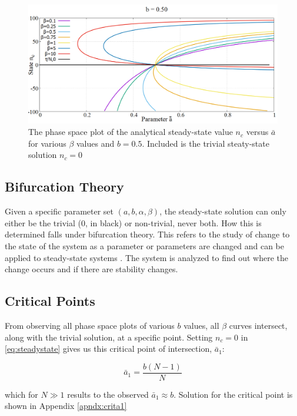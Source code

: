 \begin{figure}
 \centering
  \includegraphics[width=\linewidth]{images/chapter3/phaseSpace.png}
  \caption{The phase space plot of the analytical steady-state value $n_{c}$ versus $\bar{a}$ for various $\beta$ values and $b = 0.5$. Included is the trivial steaty-state solution $n_{c} = 0$}
  \label{fig:phaseSpace}
\end{figure}

\subsection{Bifurcation Theory}
\hspace{\parindent}Given a specific parameter set $(a,b,\alpha,\beta)$, the steady-state solution can only either be the trivial ($0$, in black) or non-trivial, never both. How this is determined falls under bifurcation theory. 
This refers to the study of change to the state of the system as a parameter or parameters are changed and can be applied to steady-state systems \cite{bifurcation}.
The system is analyzed to find out where the change occurs and if there are stability changes.


\subsection{Critical Points}
\hspace{\parindent}From observing all phase space plots of various $b$ values, all $\beta$ curves intersect, along with the trivial solution, at a specific point.
Setting $n_{c} = 0$ in \eqref{eq:steadystate} gives us this critical point of intersection, $\bar{a}_{1}$:

\begin{equation}
\bar{a}_{1} = \frac{b(N-1)}{N}
\end{equation}

which for $N\gg1$ results to the observed $\bar{a}_{1}\approx b$. Solution for the critical point is shown in Appendix \ref{apndx:crita1}

